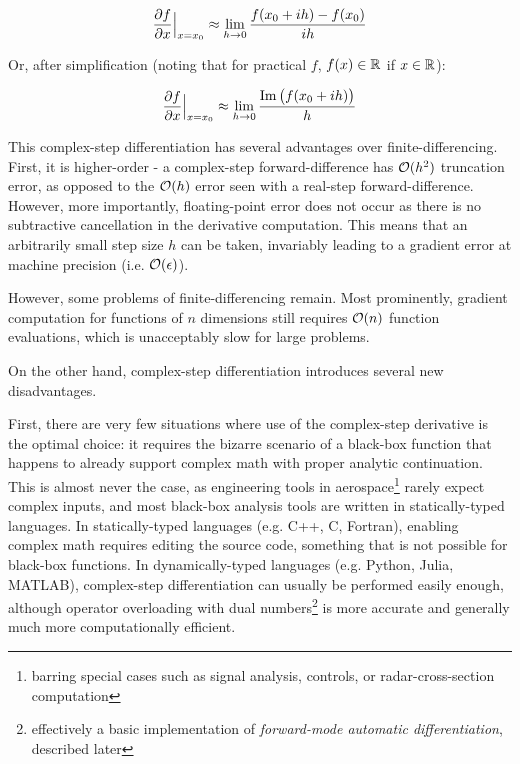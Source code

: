 \begin{equation}
    \frac{\partial f}{\partial x}\Big|_{x=x_0} \approx \lim_{h \to 0} \frac{f(x_0 + ih) - f(x_0)}{ih}
\end{equation}

Or, after simplification (noting that for practical $f$, $f(x) \in \mathbb{R}$ if $x \in \mathbb{R}$):

\begin{equation}
    \frac{\partial f}{\partial x}\Big|_{x=x_0} \approx \lim_{h \to 0} \frac{\operatorname{Im}\big(f(x_0 + ih)\big)}{h}
\end{equation}

This complex-step differentiation has several advantages over finite-differencing. First, it is higher-order - a complex-step forward-difference has $\mathcal{O}(h^2)$ truncation error, as opposed to the $\mathcal{O}(h)$ error seen with a real-step forward-difference. However, more importantly, floating-point error does not occur as there is no subtractive cancellation in the derivative computation. This means that an arbitrarily small step size $h$ can be taken, invariably leading to a gradient error at machine precision (i.e. $\mathcal{O}(\epsilon)$).

However, some problems of finite-differencing remain. Most prominently, gradient computation for functions of $n$ dimensions still requires $\mathcal{O}(n)$ function evaluations, which is unacceptably slow for large problems.

On the other hand, complex-step differentiation introduces several new disadvantages.

First, there are very few situations where use of the complex-step derivative is the optimal choice: it requires the bizarre scenario of a black-box function that happens to already support complex math with proper analytic continuation. This is almost never the case, as engineering tools in aerospace\footnote{barring special cases such as signal analysis, controls, or radar-cross-section computation} rarely expect complex inputs, and most black-box analysis tools are written in statically-typed languages. In statically-typed languages (e.g. C++, C, Fortran), enabling complex math requires editing the source code, something that is not possible for black-box functions. In dynamically-typed languages (e.g. Python, Julia, MATLAB), complex-step differentiation can usually be performed easily enough, although operator overloading with dual numbers\footnote{effectively a basic implementation of \textit{forward-mode automatic differentiation}, described later} is more accurate and generally much more computationally efficient.

